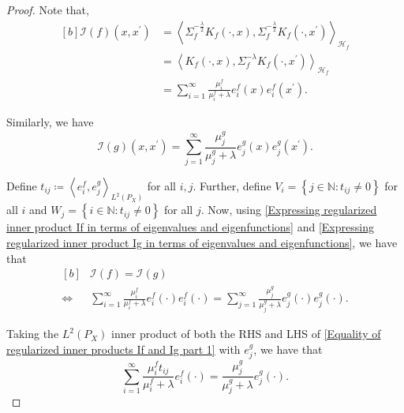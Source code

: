 \documentclass{article}
\theoremstyle{plain}
\newcommand{\Hf}{\mathcal{H}_{f}}
\newcommand{\inprod}[1]{\left \langle #1 \right\rangle}
\newcommand{\LPtwo}{L^{2}(P_{X})}
\begin{document}
\begin{proof}
    Note that,
    \begin{equation}\label{Expressing regularized inner product If in terms of eigenvalues and eigenfunctions}
    \begin{aligned}[b]
    \mathcal{I}(f)(x,x^{\prime}) &= \inprod{\Sigma_{f}^{-\frac{\lambda}{2}}K_{f}(\cdot,x),\Sigma_{f}^{-\frac{\lambda}{2}}K_{f}(\cdot,x^{\prime})}_{\Hf} \\
    & = \inprod{K_{f}(\cdot,x),\Sigma_{f}^{-\lambda}K_{f}(\cdot,x^{\prime})}_{\Hf}\\
    & = \sum_{i=1}^{\infty} \frac{\mu_{i}^{f}}{\mu_{i}^{f} + \lambda} e_{i}^{f}(x) e_{i}^{f}(x^{\prime}). 
    \end{aligned}
    \end{equation}

    Similarly, we have
    \begin{equation}\label{Expressing regularized inner product Ig in terms of eigenvalues and eigenfunctions}
    \mathcal{I}(g)(x,x^{\prime}) = \sum_{j=1}^{\infty} \frac{\mu_{j}^{g}}{\mu_{j}^{g} + \lambda} e_{j}^{g}(x) e_{j}^{g}(x^{\prime}). 
    \end{equation}

    Define $t_{ij} \coloneq \inprod{e_{i}^{f},e_{j}^{g}}_{\LPtwo}$ for all $i,j$. Further, define $V_{i} = \left\{j \in \mathbb{N} : t_{ij} \neq 0\right\}$ for all $i$ and $W_{j} = \left\{i \in \mathbb{N} : t_{ij} \neq 0\right\}$ for all $j$. Now, using \eqref{Expressing regularized inner product If in terms of eigenvalues and eigenfunctions} and \eqref{Expressing regularized inner product Ig in terms of eigenvalues and eigenfunctions}, we have that
    \begin{equation}\label{Equality of regularized inner products If and Ig part 1}
        \begin{aligned}[b]
            &\mathcal{I}(f) = \mathcal{I}(g)\\
            \iff &\sum_{i=1}^{\infty} \frac{\mu_{i}^{f}}{\mu_{i}^{f} + \lambda} e_{i}^{f}(\cdot) e_{i}^{f}(\cdot) = \sum_{j=1}^{\infty} \frac{\mu_{j}^{g}}{\mu_{j}^{g} + \lambda} e_{j}^{g}(\cdot) e_{j}^{g}(\cdot) .
        \end{aligned}
    \end{equation}

    Taking the $\LPtwo$ inner product of both the RHS and LHS of \eqref{Equality of regularized inner products If and Ig part 1} with $e_{j}^{g}$, we have that
    \begin{equation}\label{Equality of regularized inner products If and Ig part 2}
        \sum_{i=1}^{\infty} \frac{\mu_{i}^{f}t_{ij}}{\mu_{i}^{f} + \lambda} e_{i}^{f}(\cdot) = \frac{\mu_{j}^{g}}{\mu_{j}^{g} + \lambda} e_{j}^{g}(\cdot) .
    \end{equation}


\end{proof}
\end{document}
